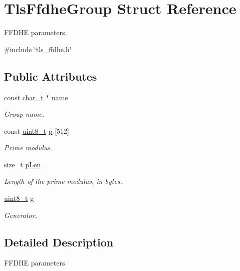 \hypertarget{structTlsFfdheGroup}{}\section{Tls\+Ffdhe\+Group Struct Reference}
\label{structTlsFfdheGroup}


F\+F\+D\+HE parameters.  




{\ttfamily \#include \char`\"{}tls\+\_\+ffdhe.\+h\char`\"{}}

\subsection*{Public Attributes}
\begin{DoxyCompactItemize}
\item 
const \hyperlink{compiler__port_8h_a40bb5262bf908c328fbcfbe5d29d0201}{char\+\_\+t} $\ast$ \hyperlink{structTlsFfdheGroup_aa3685cfc2a3493af1eb106f2f58f8b67}{name}
\begin{DoxyCompactList}\small\item\em Group name. \end{DoxyCompactList}\item 
const \hyperlink{stdint_8h_aba7bc1797add20fe3efdf37ced1182c5}{uint8\+\_\+t} \hyperlink{structTlsFfdheGroup_a3172f750e41a55b2d7ebce0fcb5d6702}{p} \mbox{[}512\mbox{]}
\begin{DoxyCompactList}\small\item\em Prime modulus. \end{DoxyCompactList}\item 
size\+\_\+t \hyperlink{structTlsFfdheGroup_a17b7822dbce7311d3bcfc86e9e213ef2}{p\+Len}
\begin{DoxyCompactList}\small\item\em Length of the prime modulus, in bytes. \end{DoxyCompactList}\item 
\hyperlink{stdint_8h_aba7bc1797add20fe3efdf37ced1182c5}{uint8\+\_\+t} \hyperlink{structTlsFfdheGroup_a1363d7726f139d3ba42341876c5194cd}{g}
\begin{DoxyCompactList}\small\item\em Generator. \end{DoxyCompactList}\end{DoxyCompactItemize}


\subsection{Detailed Description}
F\+F\+D\+HE parameters. 

